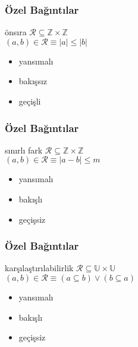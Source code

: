 \documentclass[dvipsnames]{beamer}
\theoremstyle{definition}
\theoremstyle{example}
\theoremstyle{plain}
\begin{document}
\begin{frame}
  \frametitle{Özel Bağıntılar}

  \begin{block}{önsıra}
    $\mathcal{R} \subseteq \mathbb{Z} \times \mathbb{Z}$\\
    $(a,b) \in \mathcal{R} \equiv |a| \leq |b|$

    \medskip
    \begin{itemize}
      \item yansımalı
      \item bakışsız
      \item geçişli
    \end{itemize}
  \end{block}
\end{frame}

\begin{frame}
  \frametitle{Özel Bağıntılar}

  \begin{block}{sınırlı fark}
    $\mathcal{R} \subseteq \mathbb{Z} \times \mathbb{Z}$\\
    $(a,b) \in \mathcal{R} \equiv |a-b| \leq m$

    \medskip
    \begin{itemize}
      \item yansımalı
      \item bakışlı
      \item geçişsiz
    \end{itemize}
  \end{block}
\end{frame}

\begin{frame}
  \frametitle{Özel Bağıntılar}

  \begin{block}{karşılaştırılabilirlik}
    $\mathcal{R} \subseteq \mathbb{U} \times \mathbb{U}$\\
    $(a,b) \in \mathcal{R} \equiv (a \subseteq b) \vee (b \subseteq a)$

    \medskip
    \begin{itemize}
      \item yansımalı
      \item bakışlı
      \item geçişsiz
    \end{itemize}
  \end{block}
\end{frame}
\end{document}
